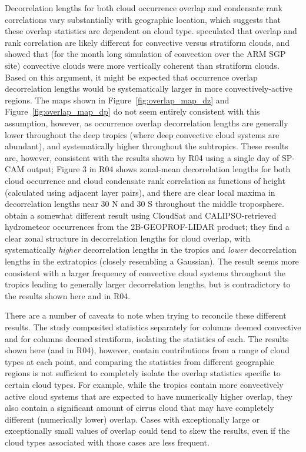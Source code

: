 Decorrelation lengths for both cloud occurrence overlap and condensate
rank correlations vary substantially with geographic location, which
suggests that these overlap statistics are dependent on cloud type.
\citet{pincus_et_al_2005} speculated that overlap and rank correlation
are likely different for convective versus stratiform clouds, and showed
that (for the month long simulation of convection over the ARM SGP site)
convective clouds were more vertically coherent than stratiform clouds.
Based on this argument, it might be expected that occurrence overlap
decorrelation lengths would be systematically larger in more
convectively-active regions. The maps shown in
Figure~\ref{fig:overlap_map_dz} and Figure~\ref{fig:overlap_map_dp} do
not seem entirely consistent with this assumption, however, as
occurrence overlap decorrelation lengths are generally lower throughout
the deep tropics (where deep convective cloud systems are abundant), and
systematically higher throughout the subtropics. These results are,
however, consistent with the results shown by R04 using a single day of
SP-CAM output; Figure 3 in R04 shows zonal-mean decorrelation lengths
for both cloud occurrence and cloud condensate rank correlation as
functions of height (calculated using adjacent layer pairs), and there
are clear local maxima in decorrelation lengths near 30 N and 30 S
throughout the middle troposphere. \citet{oreopoulos_et_al_2012} obtain
a somewhat different result using CloudSat and CALIPSO-retrieved
hydrometeor occurrences from the 2B-GEOPROF-LIDAR product; they find a
clear zonal structure in decorrelation lengths for cloud overlap, with
systematically \emph{higher} decorrelation lengths in the tropics and
\emph{lower} decorrelation lengths in the extratopics (closely
resembling a Gaussian). The \citet{oreopoulos_et_al_2012} result seems
more consistent with a larger frequency of convective cloud systems
throughout the tropics leading to generally larger decorrelation
lengths, but is contradictory to the results shown here and in R04.

There are a number of caveats to note when trying to reconcile these
different results. The \citet{pincus_et_al_2005} study composited
statistics separately for columns deemed convective and for columns
deemed stratiform, isolating the statistics of each. The results shown
here (and in R04), however, contain contributions from a range of cloud
types at each point, and comparing the statistics from different
geographic regions is not sufficient to completely isolate the overlap
statistics specific to certain cloud types. For example, while the
tropics contain more convectively active cloud systems that are expected
to have numerically higher overlap, they also contain a significant
amount of cirrus cloud that may have completely different (numerically
lower) overlap. Cases with exceptionally large or exceptionally small
values of overlap could tend to skew the results, even if the cloud
types associated with those cases are less frequent.

